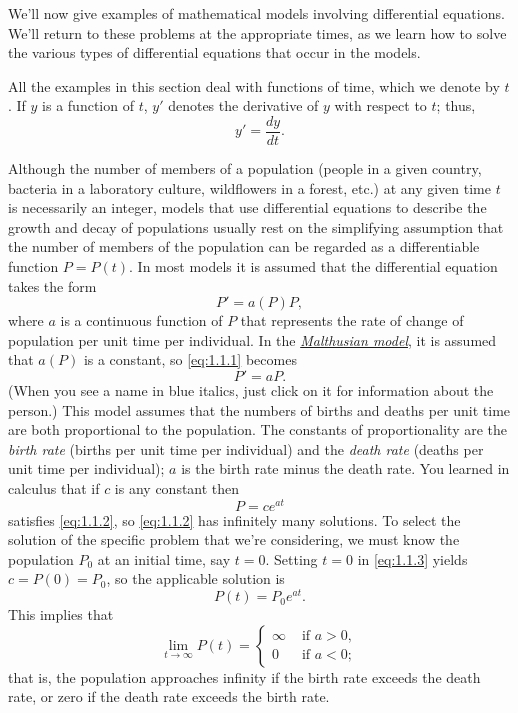 We'll now give examples of mathematical models involving differential equations. We'll return to these problems at the appropriate times, as we learn how to solve the various types of differential equations that occur in the models.

All the examples in this section deal with functions of time, which we denote by $t$. If $y$ is a function of $t$, $y'$ denotes the derivative of $y$ with respect to $t$; thus,
\[
  y'=\frac{dy}{dt}.
\]


\noindent
Although the number of members of a population (people in a given country, bacteria in a laboratory culture, wildflowers in a forest, etc.) at any given time $t$ is necessarily an integer, models that use differential equations to describe the growth and decay of populations usually rest on the simplifying assumption that the number of members of the population can be regarded as a differentiable function $P=P(t)$. In most models it is assumed that the differential equation takes the form
\begin{equation}
  \label{eq:1.1.1}P'=a(P)P,
\end{equation}
where $a$ is a continuous function of $P$ that represents the rate of change of population per unit time per individual. In the
\href{https://en.wikipedia.org/wiki/Thomas_Robert_Malthus}{\color{blue}
\it Malthusian model}, it is assumed that $a(P)$ is a constant, so \eqref{eq:1.1.1} becomes
\begin{equation}
  \label{eq:1.1.2}P'=aP.
\end{equation}
\color{blue}
(When you see a name in blue italics, just click on it for information about the person.)
\color{black}
This model assumes that the numbers of births and deaths per unit time are both proportional to the population. The constants of proportionality are the {\color{blue}\it birth rate\/} (births per unit time per individual) and the {\color{blue}\it death rate\/} (deaths per unit time per individual); $a$ is the birth rate minus the death rate. You learned in calculus that if $c$ is any constant then
\begin{equation}
  \label{eq:1.1.3}P=ce^{at}
\end{equation}
satisfies \eqref{eq:1.1.2}, so \eqref{eq:1.1.2} has infinitely many solutions. To select the solution of the specific problem that we're considering, we must know the population $P_{0}$ at an initial time, say $t=0$. Setting $t=0$ in \eqref{eq:1.1.3} yields $c=P(0)=P_{0}$, so the applicable solution is
\[
  P(t)=P_{0}e^{at}.
\]
This implies that
\[
  \lim_{t\to\infty}P(t)=\left\{
  \begin{array}{cl}
    \infty & \mbox{ if }a>0, \\
    0      & \mbox{ if }a<0;
  \end{array}\right.
\]
that is, the population approaches infinity if the birth rate exceeds the death rate, or zero if the death rate exceeds the birth rate.

